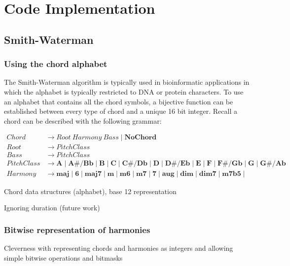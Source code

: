 \chapter{Code Implementation}

\section{Smith-Waterman}

\subsection{Using the chord alphabet}

The Smith-Waterman algorithm is typically used in bioinformatic applications in which the alphabet is typically restricted to DNA or protein characters. To use an alphabet that contains all the chord symbols, a bijective function can be established between every type of chord and a unique 16 bit integer. Recall a chord can be described with the following grammar:

\begin{align*}
Chord &\to Root\ Harmony \ Bass \mid \textbf{NoChord} \\
Root &\to PitchClass \\
Bass &\to PitchClass \\
PitchClass &\to \textbf{A} \mid \textbf{A\#/Bb} \mid \textbf{B} \mid \textbf{C} \mid \textbf{C\#/Db} \mid \textbf{D} \mid \textbf{D\#/Eb} \mid \textbf{E} \mid \textbf{F} \mid \textbf{F\#/Gb} \mid \textbf{G} \mid \textbf{G\#/Ab} \\
Harmony &\to \textbf{maj} \mid \textbf{6} \mid \textbf{maj7} \mid \textbf{m} \mid \textbf{m6} \mid \textbf{m7} \mid \textbf{7} \mid \textbf{aug} \mid \textbf{dim} \mid \textbf{dim7} \mid \textbf{m7b5} \mid \end{align*}

\item Chord data structures (alphabet), base 12 representation

\item Ignoring duration (future work)

\subsection{Bitwise representation of harmonies}

\item Cleverness with representing chords and harmonies as integers and allowing simple bitwise operations and bitmasks

